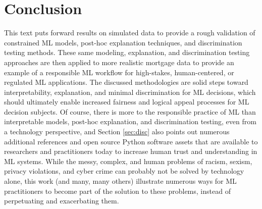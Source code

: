 \documentclass[information,article,submit,moreauthors,pdftex]{definitions/mdpi}
\begin{document}
\section{Conclusion}\label{sec:con}

This text puts forward results on simulated data to provide a rough validation of constrained ML models, post-hoc explanation techniques, and discrimination testing methods. These same modeling, explanation, and discrimination testing approaches are then applied to more realistic mortgage data to provide an example of a responsible ML workflow for high-stakes, human-centered, or regulated ML applications. The discussed methodologies are solid steps toward interpretability, explanation, and minimal discrimination for ML decisions, which should ultimately enable increased fairness and logical appeal processes for ML decision subjects. Of course, there is more to the responsible practice of ML than interpretable models, post-hoc explanation, and discrimination testing, even from a technology perspective, and Section \ref{sec:disc} also points out numerous additional references and open source Python software assets that are available to researchers and practitioners today to increase human trust and understanding in ML systems. While the messy, complex, and human problems of racism, sexism, privacy violations, and cyber crime can probably not be solved by technology alone, this work (and many, many others) illustrate numerous ways for ML practitioners to become part of the solution to these problems, instead of perpetuating and exacerbating them. 

\end{document}
